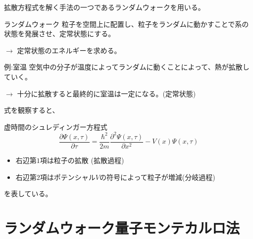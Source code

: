 \documentclass[dvipdfmx]{beamer}
\begin{document}
    \begin{frame}
      拡散方程式を解く手法の一つであるランダムウォークを用いる。
      \begin{block}{ランダムウォーク}
          粒子を空間上に配置し、粒子をランダムに動かすことで系の状態を発展させ、定常状態にする。

          $\to$ 定常状態のエネルギーを求める。
      \end{block}

      \begin{exampleblock}{例:室温}
        空気中の分子が温度によってランダムに動くことによって、熱が拡散していく。

        $\to$ 十分に拡散すると最終的に室温は一定になる。(定常状態)
      \end{exampleblock}

    \end{frame}

    \begin{frame}
      式を観察すると、
        \begin{block}{虚時間のシュレディンガー方程式}
            \begin{equation}
                \label{tmp1}
        \dfrac{\partial \Psi(x,\tau)}{\partial \tau} = \dfrac{\hbar^2}{2m}\dfrac{\partial^2 \Psi(x,\tau)}{\partial x^2} - V(x)\Psi(x,\tau) \nonumber
            \end{equation}
        \end{block}

        \begin{itemize}
            \item 右辺第$1$項は粒子の拡散 (拡散過程)
            \item 右辺第$2$項はポテンシャル$V$の符号によって粒子が増減(分岐過程)
        \end{itemize}

        を表している。

    \end{frame}

    \section{ランダムウォーク量子モンテカルロ法}
\end{document}
